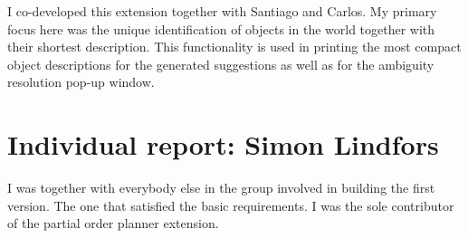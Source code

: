\documentclass[11pt]{article}
\begin{document}
I co-developed this extension together with Santiago and Carlos. My primary 
focus here was the unique identification of objects in the world together with 
their shortest description. This functionality is used in printing the most 
compact object descriptions for the generated suggestions as well as for the 
ambiguity resolution pop-up window.

\section{Individual report: Simon Lindfors}

I was together with everybody else in the group involved in building the first 
version.  The one that satisfied the basic requirements.  I was the sole 
contributor of the partial order planner extension.
\end{document}
